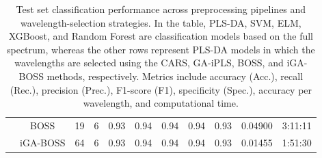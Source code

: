 \begin{table}[th!]
\begin{tabular}{ccccccccccc}
          & BOSS         &   19 &  6 & 0.93 & 0.94 & 0.94 & 0.94 & 0.93 & 0.04900 & 3:11:11 \\
          & iGA-BOSS     &   64 &  6 & 0.93 & 0.94 & 0.94 & 0.94 & 0.93 & 0.01455 & 1:51:30 \\
\hline
\end{tabular}
\caption{Test set classification performance across preprocessing pipelines and wavelength-selection strategies. 
In the table, PLS-DA, SVM, ELM, XGBoost, and Random Forest are classification models based on the full spectrum, whereas the other rows represent PLS-DA models in which the wavelengths are selected using the CARS, GA-iPLS, BOSS, and iGA-BOSS methods, respectively.
Metrics include accuracy (Acc.), recall (Rec.), precision (Prec.), F1-score (F1), specificity (Spec.), accuracy per wavelength, and computational time.}
\label{tab:results}
\end{table}